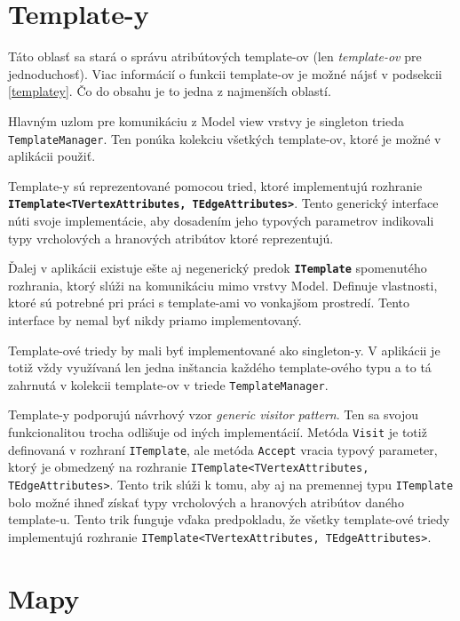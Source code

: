 \section{Template-y}

Táto oblasť sa stará o správu atribútových template-ov (len \textit{template-ov} pre jednoduchosť). Viac informácií o funkcii template-ov je možné nájsť v podsekcii \ref{templatey}. Čo do obsahu je to jedna z najmenších oblastí. 

Hlavným uzlom pre komunikáciu z Model view vrstvy je singleton trieda \texttt{TemplateManager}. Ten ponúka kolekciu všetkých template-ov, ktoré je možné v aplikácii použiť.

\bigskip

Template-y sú reprezentované pomocou tried, ktoré implementujú rozhranie \textbf{\texttt{ITemplate<TVertexAttributes, TEdgeAttributes>}}. Tento generický interface núti svoje implementácie, aby dosadením jeho typových parametrov indikovali typy vrcholových a hranových atribútov ktoré reprezentujú. 

Ďalej v aplikácii existuje ešte aj negenerický predok \textbf{\texttt{ITemplate}} spomenutého rozhrania, ktorý slúži na komunikáciu mimo vrstvy Model. Definuje vlastnosti, ktoré sú potrebné pri práci s template-ami vo vonkajšom prostredí. Tento interface by nemal byť nikdy priamo implementovaný.

Template-ové triedy by mali byť implementované ako singleton-y. V aplikácii je totiž vždy využívaná len jedna inštancia každého template-ového typu a to tá zahrnutá v kolekcii template-ov v triede \texttt{TemplateManager}.

Template-y podporujú návrhový vzor \textit{generic visitor pattern}. Ten sa svojou funkcionalitou trocha odlišuje od iných implementácií. Metóda \texttt{Visit} je totiž definovaná v rozhraní \texttt{ITemplate}, ale metóda \texttt{Accept} vracia typový parameter, ktorý je obmedzený na rozhranie \texttt{ITemplate<TVertexAttributes, TEdgeAttributes>}. Tento trik slúži k tomu, aby aj na premennej typu \texttt{ITemplate} bolo možné ihneď získať typy vrcholových a hranových atribútov daného template-u. Tento trik funguje vďaka predpokladu, že všetky template-ové triedy implementujú rozhranie \texttt{ITemplate<TVertexAttributes, TEdgeAttributes>}. 

\section{Mapy}

